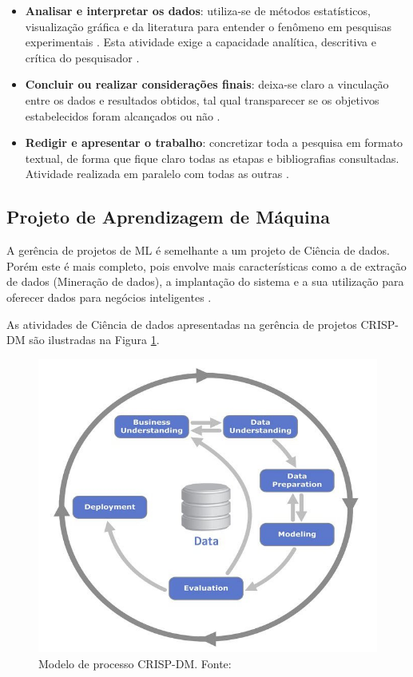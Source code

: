 \begin{itemize}
  \item \textbf{Analisar e interpretar os dados}: utiliza-se de métodos estatísticos, visualização gráfica e da literatura para entender o fenômeno em pesquisas experimentais \cite{gil_como_2002}. Esta atividade exige a capacidade analítica, descritiva e crítica do pesquisador \cite{prodanov_metodologia_2013}.   
  \item \textbf{Concluir ou realizar considerações finais}: deixa-se claro a vinculação entre os dados e resultados obtidos, tal qual transparecer se os objetivos estabelecidos foram alcançados ou não \cite{gil_como_2002}.
  \item \textbf{Redigir e apresentar o trabalho}: concretizar toda a pesquisa em formato textual, de forma que fique claro todas as etapas e bibliografias consultadas. Atividade realizada em paralelo com todas as outras \cite{prodanov_metodologia_2013}.
\end{itemize}

\subsection{Projeto de Aprendizagem de Máquina} \label{sec:projetoML}

A gerência de projetos de ML é semelhante a um projeto de Ciência de dados. Porém este é mais completo, pois envolve mais características como a de extração de dados (Mineração de dados), a implantação do sistema e a sua utilização para oferecer dados para negócios inteligentes \cite{chapman_crisp-dm_2000}.

As atividades de Ciência de dados apresentadas na gerência de projetos CRISP-DM são ilustradas na Figura \ref{fig:crispdmProcess}.

\begin{figure}[ht]
	\centering
    \includegraphics[keepaspectratio=true,scale=0.5]{figuras/crispdmProcess}
	\caption[Modelo de processo CRISP-DM]{Modelo de processo CRISP-DM. Fonte: }
    \label{fig:crispdmProcess}
\end{figure}

